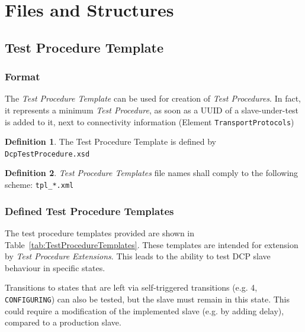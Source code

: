 \documentclass[a4paper]{scrartcl}
\theoremstyle{definition}
\newtheorem*{Def}{Definition}
\begin{document}
\section{Files and Structures}
\label{sec:files_and_structures}

\subsection{Test Procedure Template}
\label{sec:extensions:test_procedure_template}

\subsubsection{Format}
The \textit{Test Procedure Template} can be used for creation of \textit{Test Procedures}.
In fact, it represents a minimum \textit{Test Procedure}, as soon as a UUID of a slave-under-test is added to it, next to connectivity information (Element \texttt{TransportProtocols})

\begin{Def}
The Test Procedure Template is defined by \texttt{DcpTestProcedure.xsd}
\end{Def}

\begin{Def}
\textit{Test Procedure Templates} file names shall comply to the following scheme: \texttt{tpl\_*.xml}
\end{Def}

\subsubsection{Defined Test Procedure Templates}
\label{sec:test_procedure_templates}
The test procedure templates provided are shown in Table~\ref{tab:TestProcedureTemplates}.
These templates are intended for extension by \textit{Test Procedure Extensions}.
This leads to the ability to test DCP slave behaviour in specific states.

Transitions to states that are left via self-triggered transitions (e.g. 4, \texttt{CONFIGURING}) can also be tested, but the slave must remain in this state.
This could require a modification of the implemented slave (e.g. by adding delay), compared to a production slave.
\end{document}
